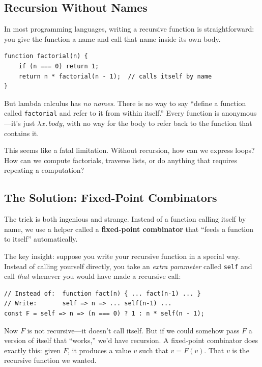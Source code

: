\documentclass[11pt,a4paper]{article}
\theoremstyle{definition}
\newcommand{\lam}{\lambda}
\begin{document}
\subsection{Recursion Without Names}

In most programming languages, writing a recursive function is straightforward:
you give the function a name and call that name inside its own body.

\begin{verbatim}
function factorial(n) {
    if (n === 0) return 1;
    return n * factorial(n - 1);  // calls itself by name
}
\end{verbatim}

But lambda calculus has \emph{no names}. There is no way to say ``define a
function called \texttt{factorial} and refer to it from within itself.'' Every
function is anonymous---it's just $\lam x.\, \mathit{body}$, with no way for
the body to refer back to the function that contains it.

This seems like a fatal limitation. Without recursion, how can we express
loops? How can we compute factorials, traverse lists, or do anything that
requires repeating a computation?

\subsection{The Solution: Fixed-Point Combinators}\label{sec:recursion}

The trick is both ingenious and strange. Instead of a function calling itself
by name, we use a helper called a \textbf{fixed-point combinator} that
``feeds a function to itself'' automatically.

The key insight: suppose you write your recursive function in a special way.
Instead of calling yourself directly, you take an \emph{extra parameter}
called \texttt{self} and call \emph{that} whenever you would have made a
recursive call:

\begin{verbatim}
// Instead of:  function fact(n) { ... fact(n-1) ... }
// Write:       self => n => ... self(n-1) ...
const F = self => n => (n === 0) ? 1 : n * self(n - 1);
\end{verbatim}

Now $F$ is not recursive---it doesn't call itself. But if we could somehow pass
$F$ a version of itself that ``works,'' we'd have recursion. A fixed-point
combinator does exactly this: given $F$, it produces a value $v$ such that
$v = F(v)$. That $v$ is the recursive function we wanted.
\end{document}
